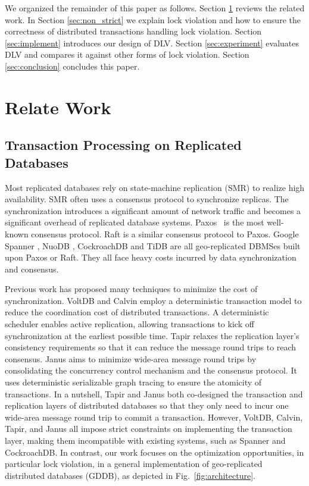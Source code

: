 \documentclass[conference]{IEEEtran}
\begin{document}
We organized the remainder of this paper as follows.
Section \ref{sec:relate_work} reviews the related work.
In Section \ref{sec:non_strict} we explain lock violation and how to ensure the correctness of distributed transactions handling lock violation.
Section \ref{sec:implement} introduces our design of DLV.
Section \ref{sec:experiment} evaluates DLV and compares it against other forms of lock violation.
Section \ref{sec:conclusion} concludes this paper.


\section{Relate Work}
\label{sec:relate_work}

\subsection{Transaction Processing on Replicated Databases}


Most replicated databases rely on state-machine replication (SMR) to realize high availability.
SMR often uses a consensus protocol to synchronize replicas.
The synchronization introduces a significant amount of network traffic and becomes a significant overhead of replicated database systems.
Paxos~\cite{Paxos:journals/tocs/Lamport98} is the most well-known consensus protocol.
Raft\cite{Raft:conf/usenix/OngaroO14} is a similar consensus protocol to Paxos.
Google Spanner \cite{Spanner:conf/osdi/CorbettDEFFFGGHHHKKLLMMNQRRSSTWW12},
NuoDB \cite{NuoDB}, CockroachDB \cite{CockroachDB} and TiDB \cite{TiDB} are all geo-replicated DBMSes built upon Paxos or Raft.
They all face heavy costs incurred by data synchronization and consensus.

Previous work has proposed many techniques
to minimize the cost of synchronization.
VoltDB \cite{VoltDB} and Calvin \cite{Calvin:conf/sigmod/ThomsonDWRSA12} employ a deterministic transaction model
to reduce the coordination cost of distributed transactions.
A deterministic scheduler enables active replication, allowing transactions to kick off synchronization at the earliest possible time.
Tapir \cite{Tapir:conf/sosp/ZhangSSKP15} relaxes the replication layer's consistency requirements so that it can reduce the message round trips to reach consensus.
Janus \cite{Janus:conf/osdi/MuNLL16} aims to minimize wide-area message round trips
by consolidating the concurrency control mechanism and the consensus protocol.
It uses deterministic serializable graph tracing to ensure the atomicity of transactions.
In a nutshell, Tapir and Janus both co-designed the transaction and replication layers of distributed databases so that they only need to incur one wide-area message round trip to commit a transaction.
However, VoltDB, Calvin, Tapir, and Janus all impose strict constraints on implementing the transaction layer, making them incompatible with existing systems, such as Spanner and CockroachDB.
In contrast, our work focuses on the optimization opportunities, in particular lock violation, in a general implementation of geo-replicated distributed databases (GDDB), as depicted in Fig.~\ref{fig:architecture}.
\end{document}
